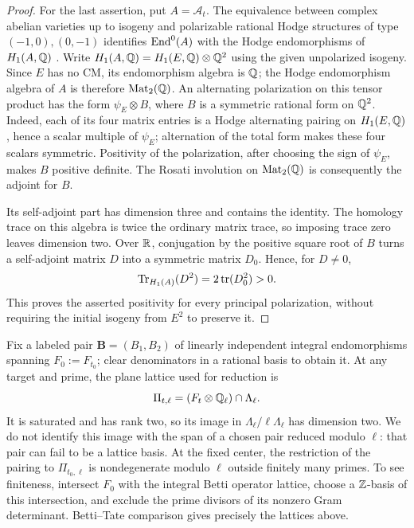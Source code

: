 \begin{proof}
For the last assertion, put $A=\mathscr A_t$.  The equivalence between
complex abelian varieties up to isogeny and polarizable rational
Hodge structures of type $(-1,0),(0,-1)$ identifies
$\operatorname{End}^0(A)$ with the Hodge endomorphisms of $H_1(A,\mathbb Q)$
\cite[Theorem~4.1]{MilneShimura1995}.  Write
$H_1(A,\mathbb Q)=H_1(E,\mathbb Q)\otimes\mathbb Q^2$ using the given unpolarized
isogeny.  Since $E$ has no CM, its endomorphism algebra is $\mathbb Q$;
the Hodge endomorphism algebra of $A$ is therefore $\operatorname{Mat}_2(\mathbb Q)$.
An alternating polarization on this tensor product has the form
$\psi_E\otimes B$, where $B$ is a symmetric rational form on
$\mathbb Q^2$.  Indeed, each of its four matrix entries is a Hodge
alternating pairing on $H_1(E,\mathbb Q)$, hence a scalar multiple of
$\psi_E$; alternation of the total form makes these four scalars
symmetric.  Positivity of the polarization, after choosing the sign
of $\psi_E$, makes $B$ positive definite.  The Rosati involution on
$\operatorname{Mat}_2(\mathbb Q)$ is consequently the adjoint for $B$.

Its self-adjoint part has dimension three and contains the identity.
The homology trace on this algebra is twice the ordinary matrix
trace, so imposing trace zero leaves dimension two.  Over $\mathbb R$,
conjugation by the positive square root of $B$ turns a self-adjoint
matrix $D$ into a symmetric matrix $D_0$.  Hence, for $D\ne0$,
\[
 \operatorname{Tr}_{H_1(A)}(D^2)=2\operatorname{tr}(D_0^2)>0.
\]
This proves the asserted positivity for every principal
polarization, without requiring the initial isogeny from $E^2$ to
preserve it.
\end{proof}

Fix a labeled pair $\mathbf B=(B_1,B_2)$ of linearly independent
integral endomorphisms spanning $F_0:=F_{t_0}$; clear denominators
in a rational basis to obtain it.  At any target and prime, the
plane lattice used for reduction is
\begin{equation}\label{geo:saturated-plane}
 \Pi_{t,\ell}=(F_t\otimes\mathbb Q_\ell)\cap\Lambda_\ell.
\end{equation}
It is saturated and has rank two, so its image in
$\Lambda_\ell/\ell\Lambda_\ell$ has dimension two.  We do not
identify this image with the span of a chosen pair reduced modulo
$\ell$: that pair can fail to be a lattice basis.  At the fixed
center, the restriction of the pairing to
$\Pi_{t_0,\ell}$ is nondegenerate modulo $\ell$ outside finitely
many primes.  To see finiteness, intersect $F_0$ with the integral
Betti operator lattice, choose a $\mathbb Z$-basis of this intersection,
and exclude the prime divisors of its nonzero Gram determinant.
Betti--Tate comparison gives precisely the lattices above.

